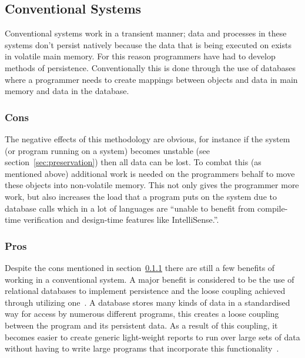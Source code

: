 \documentclass[a4paper,12pt]{article}
\begin{document}
\subsection{Conventional Systems}
Conventional systems work in a transient manner; data and processes in these systems don't persist natively because the data that is being executed on exists in volatile main memory. For this reason programmers have had to develop methods of persistence. Conventionally this is done through the use of databases where a programmer needs to create mappings between objects and data in main memory and data in the database.
\subsubsection{Cons}\label{sec:cons}
The negative effects of this methodology are obvious, for instance if the system (or program running on a system) becomes unstable (see section~\ref{sec:preservation}) then all data can be lost. To combat this (as mentioned above) additional work is needed on the programmers behalf to move these objects into non-volatile memory. This not only gives the programmer more work, but also increases the load that a program puts on the system due to database calls which in a lot of languages are ``unable to benefit from compile-time verification and design-time features like IntelliSense.''\citep[p~1]{linqsql}.
\subsubsection{Pros}
Despite the cons mentioned in section~\ref{sec:cons} there are still a few benefits of working in a conventional system. A major benefit is considered to be the use of relational databases to implement persistence and the loose coupling achieved through utilizing one~\citep{Databases}.
A database stores many kinds of data in a standardised way for access by numerous different programs, this creates a loose coupling between the program and its persistent data. As a result of this coupling, it becomes easier to create generic light-weight reports to run over large sets of data without having to write large programs that incorporate this functionality~\citep{XML}.
\end{document}
